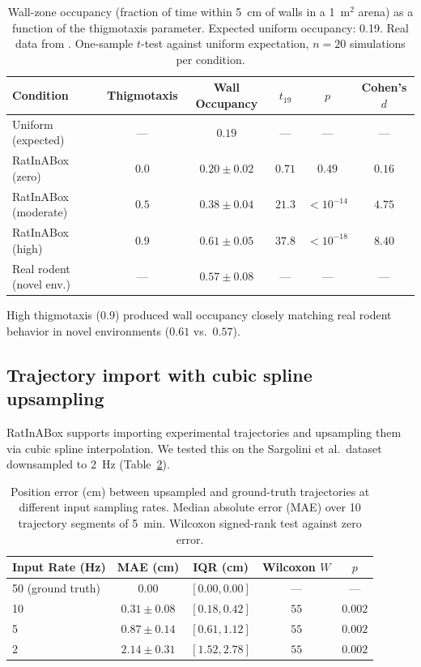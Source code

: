 \documentclass[11pt]{article}
\begin{document}
\begin{table}[H]
\centering
\caption{Wall-zone occupancy (fraction of time within 5~cm of walls in a 1~m$^{2}$ arena) as a function of the thigmotaxis parameter. Expected uniform occupancy: 0.19. Real data from \citet{satoh2006ethogram}. One-sample $t$-test against uniform expectation, $n = 20$ simulations per condition.}
\label{tab:thigmotaxis}
\begin{tabular}{lccccc}
\toprule
\textbf{Condition} & \textbf{Thigmotaxis} & \textbf{Wall Occupancy} & \textbf{$t_{19}$} & \textbf{$p$} & \textbf{Cohen's $d$} \\
\midrule
Uniform (expected) & --- & $0.19$ & --- & --- & --- \\
RatInABox (zero) & $0.0$ & $0.20 \pm 0.02$ & $0.71$ & $0.49$ & $0.16$ \\
RatInABox (moderate) & $0.5$ & $0.38 \pm 0.04$ & $21.3$ & $< 10^{-14}$ & $4.75$ \\
RatInABox (high) & $0.9$ & $0.61 \pm 0.05$ & $37.8$ & $< 10^{-18}$ & $8.40$ \\
Real rodent (novel env.) & --- & $0.57 \pm 0.08$ & --- & --- & --- \\
\bottomrule
\end{tabular}
\end{table}

High thigmotaxis ($0.9$) produced wall occupancy closely matching real rodent behavior in novel environments ($0.61$ vs.\ $0.57$).

\subsection{Trajectory import with cubic spline upsampling}

RatInABox supports importing experimental trajectories and upsampling them via cubic spline interpolation. We tested this on the Sargolini et al.\ dataset downsampled to 2~Hz (Table~\ref{tab:upsampling}).

\begin{table}[H]
\centering
\caption{Position error (cm) between upsampled and ground-truth trajectories at different input sampling rates. Median absolute error (MAE) over 10 trajectory segments of 5~min. Wilcoxon signed-rank test against zero error.}
\label{tab:upsampling}
\begin{tabular}{lcccc}
\toprule
\textbf{Input Rate (Hz)} & \textbf{MAE (cm)} & \textbf{IQR (cm)} & \textbf{Wilcoxon $W$} & \textbf{$p$} \\
\midrule
50 (ground truth) & $0.00$ & $[0.00, 0.00]$ & --- & --- \\
10 & $0.31 \pm 0.08$ & $[0.18, 0.42]$ & $55$ & $0.002$ \\
5 & $0.87 \pm 0.14$ & $[0.61, 1.12]$ & $55$ & $0.002$ \\
2 & $2.14 \pm 0.31$ & $[1.52, 2.78]$ & $55$ & $0.002$ \\
\bottomrule
\end{tabular}
\end{table}
\end{document}
